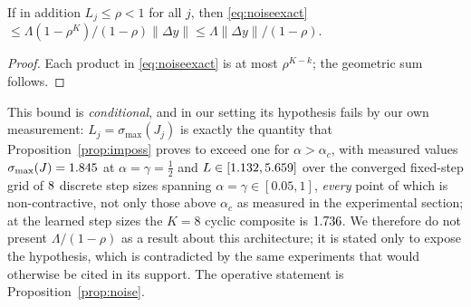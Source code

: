 \documentclass[journal,cmes,article,submit,moreauthors,pdftex]{Definitions/tsp}
\newcommand{\norm}[1]{\lVert #1 \rVert}
\newcommand{\numv}[1]{#1}
\begin{document}
\begin{Corollary}\label{cor:noisegeo}
If in addition $L_j\le\rho<1$ for all $j$, then
\eqref{eq:noiseexact} $\le\Lambda(1-\rho^{K})/(1-\rho)\norm{\Delta y}
\le\Lambda\norm{\Delta y}/(1-\rho)$.
\end{Corollary}
\begin{proof}
Each product in \eqref{eq:noiseexact} is at most $\rho^{K-k}$; the geometric sum follows.
\end{proof}
This bound is \emph{conditional}, and in our setting its hypothesis fails by our own measurement:
$L_j=\sigma_{\max}(J_j)$ is exactly the quantity that Proposition~\ref{prop:imposs} proves to exceed
one for $\alpha>\alpha_c$, with measured values
$\sigma_{\max}(J)=\numv{\NumPhysSigma}$ at $\alpha=\gamma=\tfrac12$ and
$L\in[\numv{\NumSigMin},\numv{\NumSigMax}]$ over the converged fixed-step grid of
$\numv{\NumAlphaSweepN}$ discrete step sizes spanning $\alpha=\gamma\in[0.05,1]$, \emph{every}
point of which is non-contractive, not only those
above $\alpha_c$ as measured in the experimental section; at the learned step sizes the $K{=}8$ cyclic composite
is $\numv{\NumSigCompCons}$. We therefore do not present $\Lambda/(1-\rho)$ as a result about this
architecture; it is stated only to expose the hypothesis, which is contradicted by the same
experiments that would otherwise be cited in its support. The operative statement is
Proposition~\ref{prop:noise}.
\end{document}
